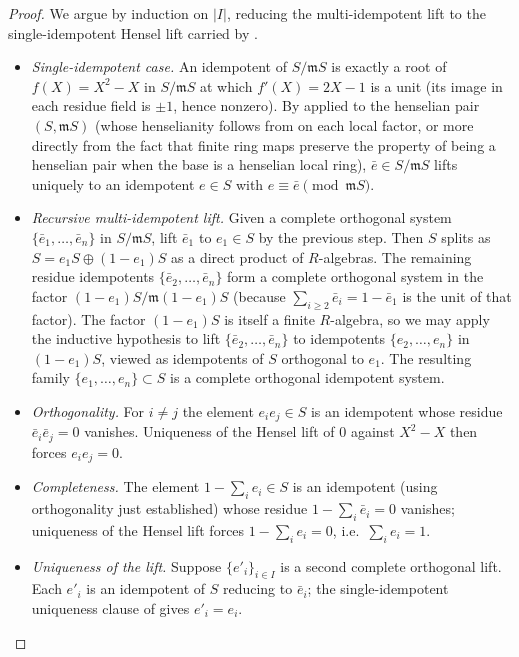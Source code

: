 \begin{proof}
  We argue by induction on $|I|$, reducing the multi-idempotent
  lift to the single-idempotent Hensel lift carried by
  .
  \begin{itemize}
    \item \emph{Single-idempotent case.} An idempotent of
      $S/\mathfrak m S$ is exactly a root of $f(X) = X^2 - X$
      in $S/\mathfrak m S$ at which $f'(X) = 2 X - 1$ is a unit
      (its image in each residue field is $\pm 1$, hence nonzero).
      By  applied
      to the henselian pair $(S, \mathfrak m S)$ (whose henselianity
      follows from  on
      each local factor, or more directly from the fact that finite
      ring maps preserve the property of being a henselian pair when
      the base is a henselian local ring), $\bar e \in S/\mathfrak m S$
      lifts uniquely to an idempotent $e \in S$ with
      $e \equiv \bar e \pmod{\mathfrak m S}$.
    \item \emph{Recursive multi-idempotent lift.} Given a complete
      orthogonal system $\{\bar e_1, \dots, \bar e_n\}$ in
      $S/\mathfrak m S$, lift $\bar e_1$ to $e_1 \in S$ by the
      previous step. Then $S$ splits as $S = e_1 S \oplus (1 - e_1) S$
      as a direct product of $R$-algebras. The remaining residue
      idempotents $\{\bar e_2, \dots, \bar e_n\}$ form a complete
      orthogonal system in the factor
      $(1 - e_1) S / \mathfrak m (1 - e_1) S$ (because
      $\sum_{i \ge 2} \bar e_i = 1 - \bar e_1$ is the unit of that
      factor). The factor $(1 - e_1) S$ is itself a finite
      $R$-algebra, so we may apply the inductive hypothesis to lift
      $\{\bar e_2, \dots, \bar e_n\}$ to idempotents
      $\{e_2, \dots, e_n\}$ in $(1 - e_1) S$, viewed as idempotents
      of $S$ orthogonal to $e_1$. The resulting family
      $\{e_1, \dots, e_n\} \subset S$ is a complete orthogonal
      idempotent system.
    \item \emph{Orthogonality.} For $i \ne j$ the element
      $e_i e_j \in S$ is an idempotent whose residue
      $\bar e_i \bar e_j = 0$ vanishes. Uniqueness of the Hensel
      lift of $0$ against $X^2 - X$ then forces $e_i e_j = 0$.
    \item \emph{Completeness.} The element $1 - \sum_i e_i \in S$
      is an idempotent (using orthogonality just established) whose
      residue $1 - \sum_i \bar e_i = 0$ vanishes; uniqueness of the
      Hensel lift forces $1 - \sum_i e_i = 0$, i.e.\
      $\sum_i e_i = 1$.
    \item \emph{Uniqueness of the lift.} Suppose
      $\{e'_i\}_{i \in I}$ is a second complete orthogonal lift.
      Each $e'_i$ is an idempotent of $S$ reducing to $\bar e_i$;
      the single-idempotent uniqueness clause of
       gives
      $e'_i = e_i$.
  \end{itemize}
\end{proof}

